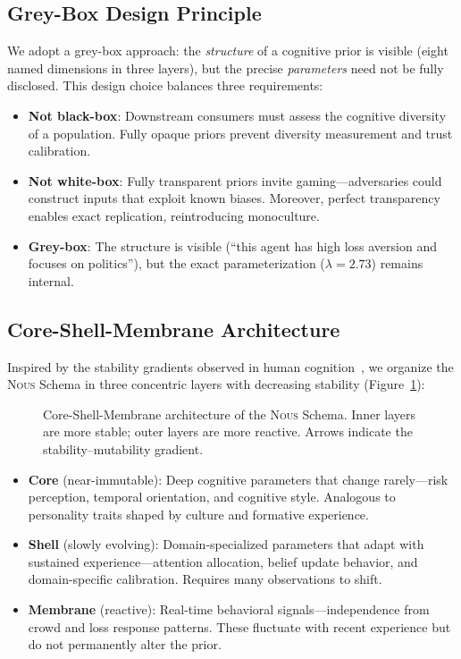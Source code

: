 \documentclass[11pt]{article}
\newcommand{\nous}{\textsc{Nous}}
\begin{document}
\subsection{Grey-Box Design Principle}

We adopt a grey-box approach: the \emph{structure} of a cognitive prior is visible (eight named dimensions in three layers), but the precise \emph{parameters} need not be fully disclosed. This design choice balances three requirements:
\begin{itemize}[leftmargin=*,itemsep=1pt]
    \item \textbf{Not black-box}: Downstream consumers must assess the cognitive diversity of a population. Fully opaque priors prevent diversity measurement and trust calibration.
    \item \textbf{Not white-box}: Fully transparent priors invite gaming---adversaries could construct inputs that exploit known biases. Moreover, perfect transparency enables exact replication, reintroducing monoculture.
    \item \textbf{Grey-box}: The structure is visible (``this agent has high loss aversion and focuses on politics''), but the exact parameterization ($\lambda = 2.73$) remains internal.
\end{itemize}

\subsection{Core-Shell-Membrane Architecture}

Inspired by the stability gradients observed in human cognition~\citep{kahneman2011thinking, klein1998sources}, we organize the \nous{} Schema in three concentric layers with decreasing stability (Figure~\ref{fig:csm}):

\begin{figure}[t]
    \centering
    \resizebox{0.7\textwidth}{!}{}
    \caption{Core-Shell-Membrane architecture of the \nous{} Schema. Inner layers are more stable; outer layers are more reactive. Arrows indicate the stability--mutability gradient.}
    \label{fig:csm}
\end{figure}

\begin{itemize}[leftmargin=*,itemsep=2pt]
    \item \textbf{Core} (near-immutable): Deep cognitive parameters that change rarely---risk perception, temporal orientation, and cognitive style. Analogous to personality traits shaped by culture and formative experience.
    \item \textbf{Shell} (slowly evolving): Domain-specialized parameters that adapt with sustained experience---attention allocation, belief update behavior, and domain-specific calibration. Requires many observations to shift.
    \item \textbf{Membrane} (reactive): Real-time behavioral signals---independence from crowd and loss response patterns. These fluctuate with recent experience but do not permanently alter the prior.
\end{itemize}
\end{document}
